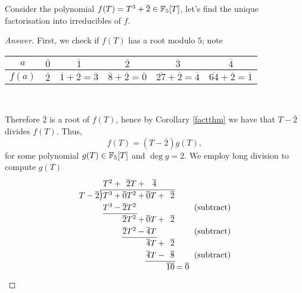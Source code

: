 \vspace*{1em}

\begin{example}
Consider the polynomial $f(T) = T^3 + \overline{2} \in \mathbb F_5[T]$, let's find the unique factorisation into irreducibles of $f$.
\end{example}
\begin{proof}[Answer]
First, we check if $f(T)$ has a root modulo $5$; note
\begin{center}
{\renewcommand{\arraystretch}{1.5}%
\begin{tabular}{|c|c|c|c|c|c|}
  \hline
  $a$ & $\overline{0}$ & $\overline{1}$ & $\overline{2}$ & $\overline{3}$ & $\overline{4}$ \\
  \hline
  $f(a)$ & $\overline{2}$ & $\overline{1} + \overline{2} = \overline{3}$ & 
  $\overline{8} + \overline{2} = \overline{0}$ & $\overline{27} + \overline{2} = \overline{4}$ & $\overline{64} + \overline{2} = \overline{1}$ \\
  \hline
\end{tabular}}\\
\end{center}
Therefore $\overline{2}$ is a root of $f(T)$, hence by Corollary \ref{factthm} we have that $T - \overline{2}$ divides $f(T)$. Thus, 
\[f(T) = (T-\overline{2}) g(T),\]
for some polynomial $g(T) \in \mathbb F_5[T]$ and $\deg g = 2$. We employ long division to compute $g(T)$
\[
\arraycolsep=1pt
\renewcommand\arraystretch{1.2}
\begin{array}{*1r @{\hskip\arraycolsep}c@{\hskip\arraycolsep} *{11}r}
        &          & T^2 & + & \overline{2}T & + & \overline{4} &  &\\
\cline{2-9}
T - \overline{2} & \longdiv & T^3 & + & \overline{0}T^2 & + & \overline{0}T & + & \overline{2}\\
        &         & T^3 & - & \overline{2}T^2 &  & &&&&&& \text{(subtract)}\\
\cline{3-5}
        &          &   &  & \overline{2}T^2 & + & \overline{0}T & + & \overline{2} \\
        &          &   &  & \overline{2}T^2 & - & \overline{4}T &  &  &&&& \text{(subtract)}\\
\cline{5-7}
        &          &   &   &   &   & \overline{4}T & + & \overline{2} \\
        &          &   &  & & & \overline{4}T & - & \overline{8} &&&& \text{(subtract)}\\
\cline{7-9}
        &          &   &   &   &   & &  & \overline{10} &= \overline{0}&&

\end{array}\]
\end{proof}
